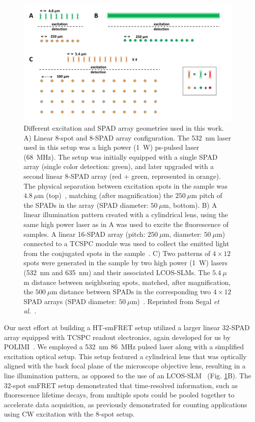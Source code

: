 \begin{figure} 
\centering\includegraphics[width=\textwidth]{chapters/figures/multispot_geometries.png}
\caption{\label{fig:multispot_geometries} Different excitation and \ac{SPAD} array geometries used in this work.
A) Linear 8-spot and 8-\ac{SPAD} array configuration. 
The 532~nm laser used in this setup was a high power (1~W) ps-pulsed laser (68~MHz).
The setup was initially equipped with a single \ac{SPAD} array (single color detection: green), and later upgraded with a second linear 8-\ac{SPAD} array (red + green, represented in orange). 
The physical separation between excitation spots in the sample was $4.8~\mu$m (top)~\cite{colyer_BOE_2010}, matching (after magnification) the $250~\mu$m pitch of the \ac{SPAD}s in the array (\ac{SPAD} diameter: $50~\mu$m, bottom).
B) A linear illumination pattern created with a cylindrical lens, using the same high power laser as in A was used to excite the fluorescence of samples. 
A linear 16-\ac{SPAD} array (pitch: $250~\mu$m, diameter: $50~\mu$m) connected to a \ac{TCSPC} module was used to collect the emitted light from the conjugated spots in the sample~\cite{ingargiola_SPIE_2016}.
C) Two patterns of $4\times12$ spots were generated in the sample by two high power (1~W) lasers (532~nm and 635~nm) and their associated \ac{LCOS-SLM}s. 
The $5.4~\mu$m distance between neighboring spots, matched, after magnification, the $500~\mu$m distance between \ac{SPAD}s in the corresponding two $4\times12$ \ac{SPAD} arrays 
(\ac{SPAD} diameter: $50~\mu$m)~\cite{ingargiola_JCP_2018}.
Reprinted from Segal \textit{et al.}~\cite{segal_methods_2019}.
}
\end{figure}

Our next effort at building a \ac{HT-smFRET} setup utilized a larger linear 32-\ac{SPAD} array equipped with \ac{TCSPC} readout electronics, again developed for us by \ac{POLIMI}~\cite{cuccato_IEEEPJ_2013}.
We employed a 532~nm 86~MHz pulsed laser along with a simplified excitation optical setup. 
This setup featured a cylindrical lens that was optically aligned with the back focal plane of the microscope objective lens, resulting in a line illumination pattern, as opposed to the use of an \ac{LCOS-SLM}~\cite{ingargiola_SPIE_2017} (Fig. \ref{fig:multispot_geometries}B). 
The 32-spot \ac{smFRET} setup demonstrated that time-resolved information, such as fluorescence lifetime decays, from multiple spots could be pooled together to accelerate data acquisition, as previously demonstrated for counting applications using \ac{CW} excitation with the 8-spot setup.

